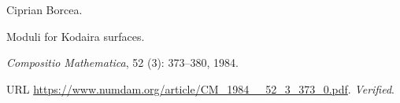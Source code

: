Ciprian Borcea.

\newblock Moduli for {Kodaira} surfaces.

\newblock \emph{Compositio Mathematica}, 52 (3): 373--380,
  1984.

\newblock URL \url{https://www.numdam.org/article/CM_1984__52_3_373_0.pdf}.
\newblock \emph{Verified}.

